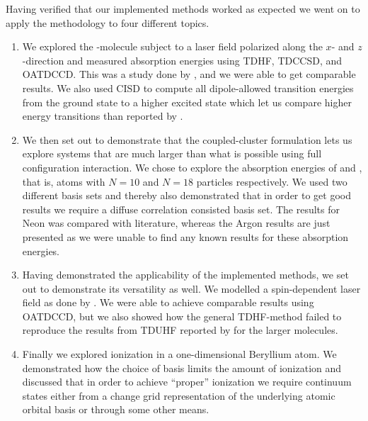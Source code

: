    Having verified that our implemented methods worked as expected we went on
    to apply the methodology to four different topics.
    \begin{enumerate}
        \item We explored the -molecule subject to a laser field
            polarized along the $x$- and $z$-direction and measured absorption
            energies using TDHF, TDCCSD, and OATDCCD.
            This was a study done by \citeauthor{nest} \cite{nest}, and we were
            able to get comparable results.
            We also used CISD to compute all dipole-allowed transition energies
            from the ground state to a higher excited state which let us compare
            higher energy transitions than reported by \citeauthor{nest}.
        \item We then set out to demonstrate that the coupled-cluster
            formulation lets us explore systems that are much larger than what
            is possible using full configuration interaction.
            We chose to explore the absorption energies of  and ,
            that is, atoms with $N = 10$ and $N = 18$ particles respectively.
            We used two different basis sets and thereby also demonstrated that
            in order to get good results we require a diffuse correlation
            consisted basis set.
            The results for Neon was compared with literature, whereas the
            Argon results are just presented as we were unable to find any known
            results for these absorption energies.
        \item Having demonstrated the applicability of the implemented methods,
            we set out to demonstrate its versatility as well.
            We modelled a spin-dependent laser field as done by
            \citeauthor{isborn} \cite{isborn}.
            We were able to achieve comparable results using OATDCCD, but we
            also showed how the general TDHF-method failed to reproduce the
            results from TDUHF reported by \citeauthor{isborn} for the larger
            molecules.
        \item Finally we explored ionization in a one-dimensional Beryllium
            atom.
            We demonstrated how the choice of basis limits the amount of
            ionization and discussed that in order to achieve ``proper''
            ionization we require continuum states either from a change grid
            representation of the underlying atomic orbital basis or through
            some other means.
    \end{enumerate}
